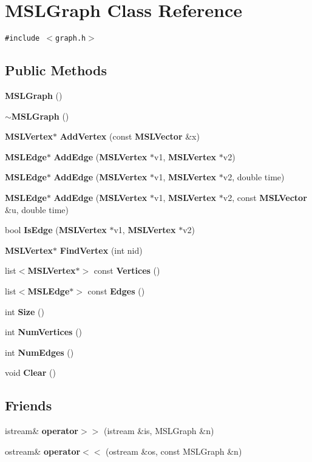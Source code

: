 \section{MSLGraph  Class Reference}
\label{class_MSLGraph}
{\tt \#include $<$graph.h$>$}

\subsection*{Public Methods}
\begin{CompactItemize}
\item 
{\bf MSLGraph} ()
\item 
{\bf $\sim$MSLGraph} ()
\item 
{\bf MSLVertex}$\ast$ {\bf Add\-Vertex} (const {\bf MSLVector} \&x)
\item 
{\bf MSLEdge}$\ast$ {\bf Add\-Edge} ({\bf MSLVertex} $\ast$v1, {\bf MSLVertex} $\ast$v2)
\item 
{\bf MSLEdge}$\ast$ {\bf Add\-Edge} ({\bf MSLVertex} $\ast$v1, {\bf MSLVertex} $\ast$v2, double time)
\item 
{\bf MSLEdge}$\ast$ {\bf Add\-Edge} ({\bf MSLVertex} $\ast$v1, {\bf MSLVertex} $\ast$v2, const {\bf MSLVector} \&u, double time)
\item 
bool {\bf Is\-Edge} ({\bf MSLVertex} $\ast$v1, {\bf MSLVertex} $\ast$v2)
\item 
{\bf MSLVertex}$\ast$ {\bf Find\-Vertex} (int nid)
\item 
list$<${\bf MSLVertex}$\ast$$>$ const {\bf Vertices} ()
\item 
list$<${\bf MSLEdge}$\ast$$>$ const {\bf Edges} ()
\item 
int {\bf Size} ()
\item 
int {\bf Num\-Vertices} ()
\item 
int {\bf Num\-Edges} ()
\item 
void {\bf Clear} ()
\end{CompactItemize}
\subsection*{Friends}
\begin{CompactItemize}
\item 
istream\& {\bf operator$>$$>$} (istream \&is, MSLGraph \&n)
\item 
ostream\& {\bf operator$<$$<$} (ostream \&os, const MSLGraph \&n)
\end{CompactItemize}


